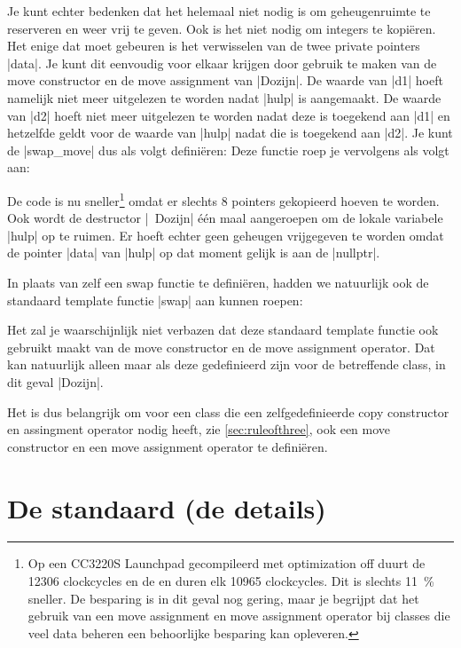\begin{cpplstShortInline}
Je kunt echter bedenken dat het helemaal niet nodig is om geheugenruimte te reserveren en weer vrij te geven. 
Ook is het niet nodig om integers te kopiëren.
Het enige dat moet gebeuren is het verwisselen van de twee private pointers |data|.
Je kunt dit eenvoudig voor elkaar krijgen door gebruik te maken van de move constructor en de move assignment van |Dozijn|.
De waarde van |d1| hoeft namelijk niet meer uitgelezen te worden nadat |hulp| is aangemaakt.
De waarde van |d2| hoeft niet meer uitgelezen te worden nadat deze is toegekend aan |d1| en hetzelfde geldt voor de waarde van |hulp| nadat die is toegekend aan |d2|.
Je kunt de |swap_move| dus als volgt definiëren:
Deze functie roep je vervolgens als volgt aan:

De code is nu sneller\footnote{%
	Op een CC3220S Launchpad gecompileerd met optimization off duurt de  12306 clockcycles en de  en  duren elk 10965 clockcycles.
	Dit is slechts \SI{11}{\percent} sneller. 
	De besparing is in dit geval nog gering, maar je begrijpt dat het gebruik van een move assignment en move assignment operator bij classes die veel data beheren een behoorlijke besparing kan opleveren.  
} omdat er slechts 8 pointers gekopieerd hoeven te worden.
Ook wordt de destructor |~Dozijn| één maal aangeroepen om de lokale variabele |hulp| op te ruimen.
Er hoeft echter geen geheugen vrijgegeven te worden omdat de pointer |data| van |hulp| op dat moment gelijk is aan de |nullptr|.

In plaats van zelf een swap functie te definiëren, hadden we natuurlijk ook de standaard template functie |swap| aan kunnen roepen:

Het zal je waarschijnlijk niet verbazen dat deze standaard template functie ook gebruikt maakt van de move constructor en de move assignment operator.
Dat kan natuurlijk alleen maar als deze gedefinieerd zijn voor de betreffende class, in dit geval |Dozijn|.

Het is dus belangrijk om voor een class die een zelfgedefinieerde copy constructor en assingment operator nodig heeft, zie \cref{sec:ruleofthree}, ook een move constructor en een move assignment operator te definiëren.

\chapter[De standaard C++ \USE{library} (de details)]{De standaard \Cpp{}  (de details)}
\label{sec:stdlibdetails}


\end{cpplstShortInline}
